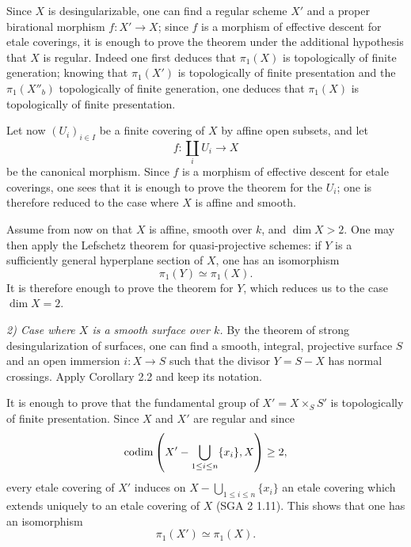 \documentclass[11pt]{article}
\begin{document}
Since $X$ is desingularizable, one can find a regular scheme $X'$ and a proper birational morphism $f:X'\to X$; since $f$ is a morphism of effective descent for etale coverings, it is enough to prove the theorem under the additional hypothesis that $X$ is regular. Indeed one first deduces that $\pi_1(X)$ is topologically of finite generation; knowing that $\pi_1(X')$ is topologically of finite presentation and the $\pi_1(X''_b)$ topologically of finite generation, one deduces that $\pi_1(X)$ is topologically of finite presentation.

Let now $(U_i)_{i\in I}$ be a finite covering of $X$ by affine open subsets, and let
\[
 f:\coprod_i U_i\longrightarrow X
\]
be the canonical morphism. Since $f$ is a morphism of effective descent for etale coverings, one sees that it is enough to prove the theorem for the $U_i$; one is therefore reduced to the case where $X$ is affine and smooth.

Assume from now on that $X$ is affine, smooth over $k$, and $\dim X>2$. One may then apply the Lefschetz theorem for quasi-projective schemes: if $Y$ is a sufficiently general hyperplane section of $X$, one has an isomorphism
\[
 \pi_1(Y)\simeq \pi_1(X).
\]
It is therefore enough to prove the theorem for $Y$, which reduces us to the case $\dim X=2$.

\emph{2) Case where $X$ is a smooth surface over $k$.} By the theorem of strong desingularization of surfaces, one can find a smooth, integral, projective surface $S$ and an open immersion $i:X\to S$ such that the divisor $Y=S-X$ has normal crossings. Apply Corollary 2.2 and keep its notation.

It is enough to prove that the fundamental group of $X'=X\times_S S'$ is topologically of finite presentation. Since $X$ and $X'$ are regular and since
\[
 \operatorname{codim}\left(X'-\bigcup_{1\le i\le n}\{x_i\},X\right)\ge2,
\]
every etale covering of $X'$ induces on $X-\bigcup_{1\le i\le n}\{x_i\}$ an etale covering which extends uniquely to an etale covering of $X$ (SGA 2 1.11). This shows that one has an isomorphism
\[
 \pi_1(X')\simeq \pi_1(X).
\]
\end{document}
